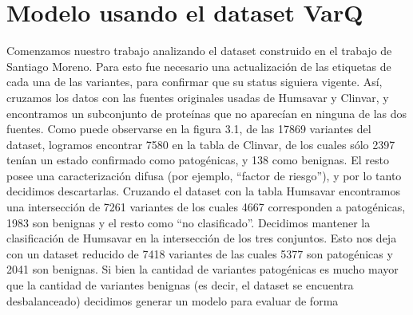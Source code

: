 \section{Modelo usando el dataset VarQ}

Comenzamos nuestro trabajo analizando el dataset construido en el trabajo de Santiago Moreno. Para esto fue necesario una actualización de las etiquetas de cada una de las variantes, para confirmar que su status siguiera vigente. Así, cruzamos los datos con las fuentes originales usadas de Humsavar y Clinvar, y encontramos un subconjunto de proteínas que no aparecían en ninguna de las dos fuentes. Como puede observarse en la figura 3.1, de las  17869 variantes del dataset, logramos encontrar 7580 en la tabla de Clinvar, de los cuales sólo 2397 tenían un estado confirmado como patogénicas, y 138 como benignas. El resto posee una caracterización difusa (por ejemplo, ``factor de riesgo''), y por lo tanto decidimos descartarlas. Cruzando el dataset con la tabla Humsavar encontramos una intersección de 7261 variantes de los cuales 4667 corresponden a patogénicas, 1983 son benignas y el resto como ``no clasificado''. Decidimos mantener la clasificación de Humsavar en la intersección de los tres conjuntos. Esto nos deja con un dataset reducido de 7418 variantes de las cuales 5377 son patogénicas y 2041 son benignas. 
Si bien la cantidad de variantes patogénicas es mucho mayor que la cantidad de variantes benignas (es decir, el dataset se encuentra desbalanceado) decidimos generar un modelo para evaluar de forma 



